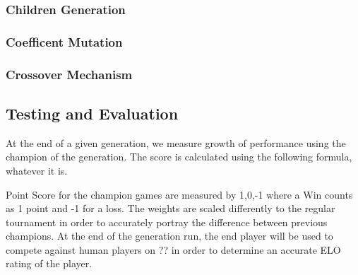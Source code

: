 \documentclass[12pt,a4paper]{article}
\begin{document}
\subsubsection{Children Generation}
\blindtext
\subsubsection{Coefficent Mutation}
\blindtext
\subsubsection{Crossover Mechanism}
\blindtext
\subsection*{Testing and Evaluation}
At the end of a given generation, we measure growth of performance using the champion of the generation. The score is calculated using the following formula, whatever it is.


Point Score for the champion games are measured by {1,0,-1} where a Win counts as 1 point and -1 for a loss. The weights are scaled differently to the regular tournament in order to accurately portray the difference between previous champions. At the end of the generation run, the end player will be used to compete against human players on ?? in order to determine an accurate ELO rating of the player.



\end{document}
